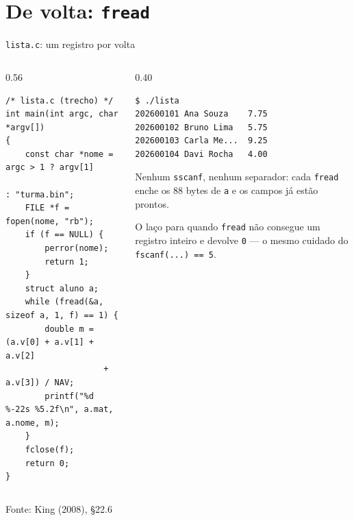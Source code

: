 \documentclass[aspectratio=169]{beamer}
\newcommand{\fonte}[1]{\vfill\hfill{\scriptsize\textcolor{UFSGray}{Fonte: #1}}}
\begin{document}
\section{De volta: \texttt{fread}}

\begin{frame}[fragile]{\texttt{lista.c}: um registro por volta}
  \vspace{-0.9em}
  \begin{columns}[T]
    \begin{column}{0.56\textwidth}
\begin{lstlisting}[style=codCs]
/* lista.c (trecho) */
int main(int argc, char *argv[])
{
    const char *nome = argc > 1 ? argv[1]
                                : "turma.bin";
    FILE *f = fopen(nome, "rb");
    if (f == NULL) {
        perror(nome);
        return 1;
    }
    struct aluno a;
    while (fread(&a, sizeof a, 1, f) == 1) {
        double m = (a.v[0] + a.v[1] + a.v[2]
                    + a.v[3]) / NAV;
        printf("%d %-22s %5.2f\n", a.mat, a.nome, m);
    }
    fclose(f);
    return 0;
}
\end{lstlisting}
    \end{column}
    \begin{column}{0.40\textwidth}
\begin{lstlisting}[style=shellS]
$ ./lista
202600101 Ana Souza    7.75
202600102 Bruno Lima   5.75
202600103 Carla Me...  9.25
202600104 Davi Rocha   4.00
\end{lstlisting}
      \small Nenhum \texttt{sscanf}, nenhum separador: cada
      \texttt{fread} enche os 88 bytes de \texttt{a} e os campos já estão
      prontos.

      \medskip
      O laço para quando \texttt{fread} não consegue um registro
      inteiro e devolve \texttt{0} --- o mesmo cuidado do
      \texttt{fscanf(...) == 5}.
    \end{column}
  \end{columns}
  \fonte{King (2008), §22.6~\cite{king2008c}}
\end{frame}
\end{document}
